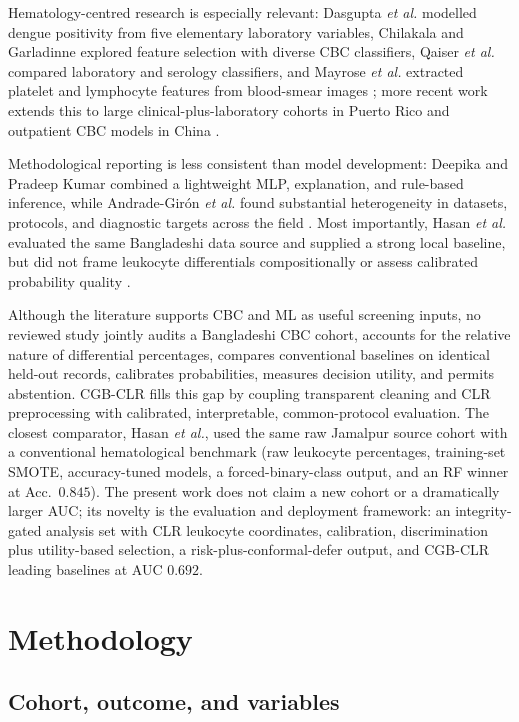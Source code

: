 \documentclass[conference]{IEEEtran}
\begin{document}
Hematology-centred research is especially relevant: Dasgupta \emph{et al.}
modelled dengue positivity from five elementary laboratory variables,
Chilakala and Garladinne explored feature selection with diverse CBC
classifiers, Qaiser \emph{et al.} compared laboratory and serology
classifiers, and Mayrose \emph{et al.} extracted platelet and lymphocyte
features from blood-smear images
\cite{dasgupta2025,chilakala2025,qaiser2024,mayrose2023}; more recent work
extends this to large clinical-plus-laboratory cohorts in Puerto Rico and
outpatient CBC models in China \cite{madewell2025,xu2026}.

Methodological reporting is less consistent than model development: Deepika
and Pradeep Kumar combined a lightweight MLP, explanation, and rule-based
inference, while Andrade-Gir\'on \emph{et al.} found substantial heterogeneity
in datasets, protocols, and diagnostic targets across the field
\cite{deepika2025,andrade2025}. Most importantly, Hasan \emph{et al.} evaluated
the same Bangladeshi data source and supplied a strong local baseline, but did
not frame leukocyte differentials compositionally or assess calibrated
probability quality \cite{hasan2026}.

Although the literature supports CBC and ML as useful screening inputs, no
reviewed study jointly audits a Bangladeshi CBC cohort, accounts for the
relative nature of differential percentages, compares conventional baselines
on identical held-out records, calibrates probabilities, measures decision
utility, and permits abstention. CGB-CLR fills this gap by coupling
transparent cleaning and CLR preprocessing with calibrated, interpretable,
common-protocol evaluation. The closest comparator, Hasan \emph{et al.}, used
the same raw Jamalpur source cohort \cite{hasan2026} with a conventional
hematological benchmark (raw leukocyte percentages, training-set SMOTE,
accuracy-tuned models, a forced-binary-class output, and an RF winner at
Acc.\ $0.845$). The present work does not claim a new cohort or a dramatically
larger AUC; its novelty is the evaluation and deployment framework: an
integrity-gated analysis set with CLR leukocyte coordinates, calibration,
discrimination plus utility-based selection, a risk-plus-conformal-defer
output, and CGB-CLR leading baselines at AUC $0.692$.

\section{Methodology}

\subsection{Cohort, outcome, and variables}
\end{document}
